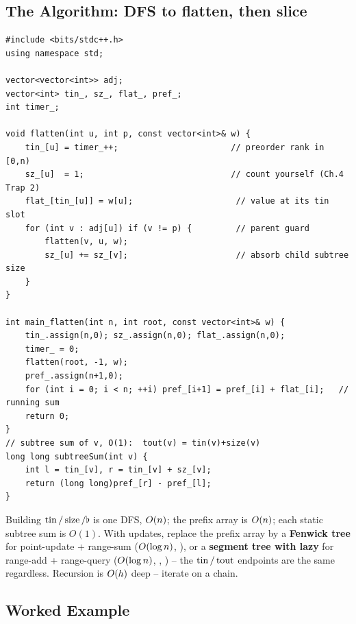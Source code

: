 \subsection{The Algorithm: DFS to flatten, then slice}

\begin{lstlisting}[caption={Build tin/size and the flattened array; answer a subtree sum by prefix}, label={lst:c24-flatten-build}]
#include <bits/stdc++.h>
using namespace std;

vector<vector<int>> adj;
vector<int> tin_, sz_, flat_, pref_;
int timer_;

void flatten(int u, int p, const vector<int>& w) {
    tin_[u] = timer_++;                       // preorder rank in [0,n)
    sz_[u]  = 1;                              // count yourself (Ch.4 Trap 2)
    flat_[tin_[u]] = w[u];                     // value at its tin slot
    for (int v : adj[u]) if (v != p) {         // parent guard
        flatten(v, u, w);
        sz_[u] += sz_[v];                      // absorb child subtree size
    }
}

int main_flatten(int n, int root, const vector<int>& w) {
    tin_.assign(n,0); sz_.assign(n,0); flat_.assign(n,0);
    timer_ = 0;
    flatten(root, -1, w);
    pref_.assign(n+1,0);
    for (int i = 0; i < n; ++i) pref_[i+1] = pref_[i] + flat_[i];   // running sum
    return 0;
}
// subtree sum of v, O(1):  tout(v) = tin(v)+size(v)
long long subtreeSum(int v) {
    int l = tin_[v], r = tin_[v] + sz_[v];
    return (long long)pref_[r] - pref_[l];
}
\end{lstlisting}
\begin{complexitybox}
Building $\operatorname{tin}/\operatorname{size}/\flat$ is one DFS, $O(n)$; the prefix array is $O(n)$; each
static subtree sum is $O(1)$. With updates, replace the prefix array by a \textbf{Fenwick
tree} for point-update + range-sum ($O(\log n)$, ), or a \textbf{segment tree
with lazy} for range-add + range-query ($O(\log n)$, , ) -- the
$\operatorname{tin}/\operatorname{tout}$ endpoints are the same regardless. Recursion is $O(h)$ deep -- iterate on a
chain.
\end{complexitybox}

\subsection{Worked Example}

